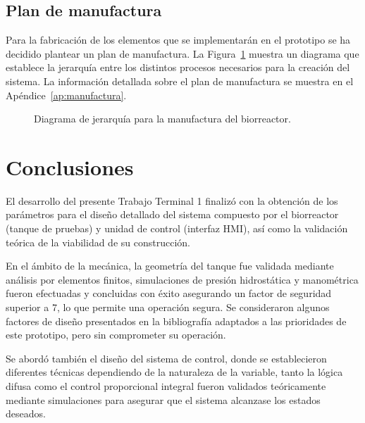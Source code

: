 \documentclass[11pt,tesis,twoside,openright,spanish]{upiiztt}
\begin{document}
\section{Plan de manufactura}

Para la fabricación de los elementos que se implementarán en el prototipo se ha
decidido plantear un plan de manufactura. La Figura~\ref{fig:jerarquia_manufactura} muestra un diagrama que
establece la jerarquía entre los distintos procesos necesarios para la creación del
sistema. La información detallada sobre el plan de manufactura se muestra en el Apéndice~\ref{ap:manufactura}.

\begin{figure}[H]
  \centering
  \caption{Diagrama de jerarquía para la manufactura del biorreactor.}
  \label{fig:jerarquia_manufactura}
\end{figure}

\chapter{Conclusiones}\label{cap9}

El desarrollo del presente Trabajo Terminal 1 finalizó con la obtención de los
parámetros para el diseño detallado del sistema compuesto por el biorreactor
(tanque de pruebas) y unidad de control (interfaz HMI), así como la validación
teórica de la viabilidad de su construcción.

En el ámbito de la mecánica, la geometría del tanque fue validada mediante análisis
por elementos finitos, simulaciones de presión hidrostática y manométrica fueron
efectuadas y concluidas con éxito asegurando un factor de seguridad superior a 7,
lo que permite una operación segura. Se consideraron algunos factores de diseño
presentados en la bibliografía adaptados a las prioridades de este prototipo, pero
sin comprometer su operación.

Se abordó también el diseño del sistema de control, donde se establecieron
diferentes técnicas dependiendo de la naturaleza de la variable, tanto la lógica
difusa como el control proporcional integral fueron validados teóricamente mediante
simulaciones para asegurar que el sistema alcanzase los estados deseados.
\end{document}
